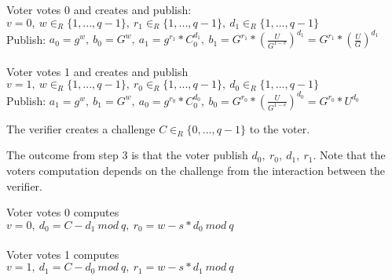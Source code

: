 \noindent
\begin{infobox}[Step 1]
Voter votes 0 and creates and publish:\\
\begin{math}v=0,\ w\in_R \{1,...,q-1\},\ r_1\in_R\{1,...,q-1\},\ d_1\in_R\{1,...,q-1\}\end{math}\\
Publish: \begin{math}a_0 = g^w,\ b_0 = G^w,\ a_1 = g^{r_1}*C^{d_1}_0,\ b_1 = G^{r_1} * (\frac{U}{G^{1-v}})^{d_1} = G^{r_1} * (\frac{U}{G})^{d_1} \end{math}\\\\
Voter votes 1 and creates and publish\\
\begin{math}v=1,\ w\in_R \{1,...,q-1\},\ r_0\in_R\{1,...,q-1\},\ d_0\in_R\{1,...,q-1\}\end{math}\\
Publish: \begin{math}a_1 = g^w,\ b_1 = G^w,\ a_0 = g^{r_0}*C^{d_0}_0,\ b_0 = G^{r_0} * (\frac{U}{G^{1-v}})^{d_0}=  G^{r_0} * U^{d_0} \end{math}
\end{infobox}

\noindent
\begin{infobox}[Step 2]
The verifier creates a challenge \begin{math}C\in_R \{0,...,q-1\}\end{math} to the voter.
\end{infobox}

\noindent
The outcome from step 3 is that the voter publish \begin{math}d_0,\ r_0,\ d_1,\ r_1\end{math}. Note that the voters computation depends on the challenge from the interaction between the verifier.

\noindent
\begin{infobox}[Step 3]
Voter votes 0 computes\\
\begin{math}v=0,\ d_0= C-d_1\ mod\ q, \ r_0=w-s*d_0 \ mod\ q\end{math}\\\\
Voter votes 1 computes\\
\begin{math}v=1,\ d_1= C-d_0\ mod\ q, \ r_1=w-s*d_1 \ mod\ q\end{math}
\end{infobox}

